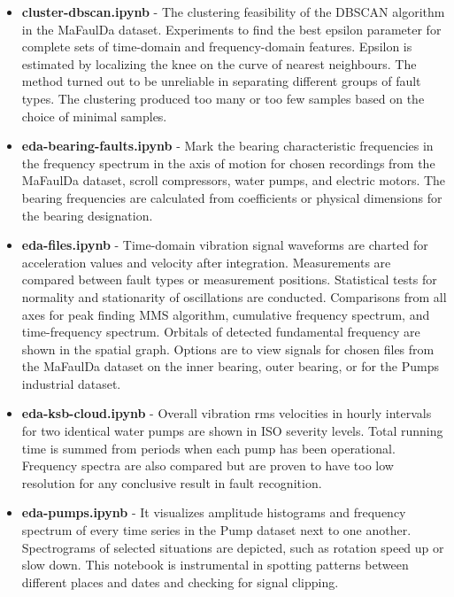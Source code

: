 \begin{itemize}[noitemsep]

\item \textbf{cluster-dbscan.ipynb} - The clustering feasibility of the DBSCAN algorithm in the MaFaulDa dataset. Experiments to find the best epsilon parameter for complete sets of time-domain and frequency-domain features. Epsilon is estimated by localizing the knee on the curve of nearest neighbours. The method turned out to be unreliable in separating different groups of fault types. The clustering produced too many or too few samples based on the choice of minimal samples.

\item \textbf{eda-bearing-faults.ipynb} - Mark the bearing characteristic frequencies in the frequency spectrum in the axis of motion for chosen recordings from the MaFaulDa dataset, scroll compressors, water pumps, and electric motors. The bearing frequencies are calculated from coefficients or physical dimensions for the bearing designation.

\item \textbf{eda-files.ipynb} - Time-domain vibration signal waveforms are charted for acceleration values and velocity after integration. Measurements are compared between fault types or measurement positions. Statistical tests for normality and stationarity of oscillations are conducted. Comparisons from all axes for peak finding MMS algorithm, cumulative frequency spectrum, and time-frequency spectrum. Orbitals of detected fundamental frequency are shown in the spatial graph. Options are to view signals for chosen files from the MaFaulDa dataset on the inner bearing, outer bearing, or for the Pumps industrial dataset.

\item \textbf{eda-ksb-cloud.ipynb} - Overall vibration rms velocities in hourly intervals for two identical water pumps are shown in ISO severity levels. Total running time is summed from periods when each pump has been operational. Frequency spectra are also compared but are proven to have too low resolution for any conclusive result in fault recognition.

\item \textbf{eda-pumps.ipynb} - It visualizes amplitude histograms and frequency spectrum of every time series in the Pump dataset next to one another.  Spectrograms of selected situations are depicted, such as rotation speed up or slow down. This notebook is instrumental in spotting patterns between different places and dates and checking for signal clipping.


\end{itemize}
